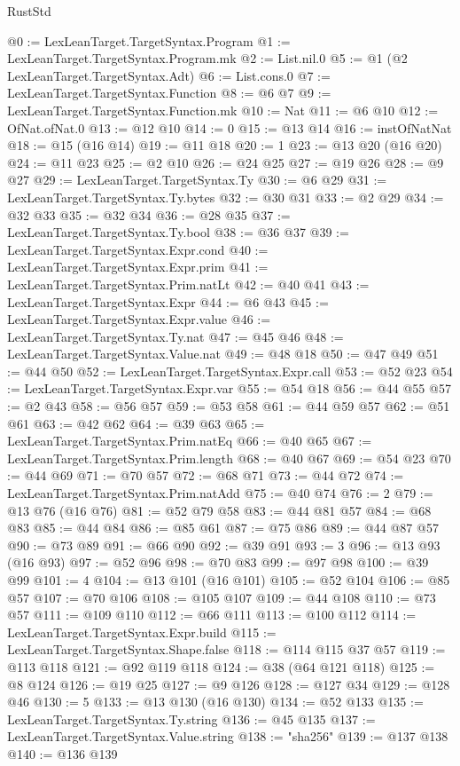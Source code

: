\begin{lexlean}{RustStd}
\begin{coremodule}
{\begin{coremodule}
{{{{{{{{{{{{{{{@0 := LexLeanTarget.TargetSyntax.Program
@1 := LexLeanTarget.TargetSyntax.Program.mk
@2 := List.nil.{0}
@5 := @1 (@2 LexLeanTarget.TargetSyntax.Adt)
@6 := List.cons.{0}
@7 := LexLeanTarget.TargetSyntax.Function
@8 := @6 @7
@9 := LexLeanTarget.TargetSyntax.Function.mk
@10 := Nat
@11 := @6 @10
@12 := OfNat.ofNat.{0}
@13 := @12 @10
@14 := 0
@15 := @13 @14
@16 := instOfNatNat
@18 := @15 (@16 @14)
@19 := @11 @18
@20 := 1
@23 := @13 @20 (@16 @20)
@24 := @11 @23
@25 := @2 @10
@26 := @24 @25
@27 := @19 @26
@28 := @9 @27
@29 := LexLeanTarget.TargetSyntax.Ty
@30 := @6 @29
@31 := LexLeanTarget.TargetSyntax.Ty.bytes
@32 := @30 @31
@33 := @2 @29
@34 := @32 @33
@35 := @32 @34
@36 := @28 @35
@37 := LexLeanTarget.TargetSyntax.Ty.bool
@38 := @36 @37
@39 := LexLeanTarget.TargetSyntax.Expr.cond
@40 := LexLeanTarget.TargetSyntax.Expr.prim
@41 := LexLeanTarget.TargetSyntax.Prim.natLt
@42 := @40 @41
@43 := LexLeanTarget.TargetSyntax.Expr
@44 := @6 @43
@45 := LexLeanTarget.TargetSyntax.Expr.value
@46 := LexLeanTarget.TargetSyntax.Ty.nat
@47 := @45 @46
@48 := LexLeanTarget.TargetSyntax.Value.nat
@49 := @48 @18
@50 := @47 @49
@51 := @44 @50
@52 := LexLeanTarget.TargetSyntax.Expr.call
@53 := @52 @23
@54 := LexLeanTarget.TargetSyntax.Expr.var
@55 := @54 @18
@56 := @44 @55
@57 := @2 @43
@58 := @56 @57
@59 := @53 @58
@61 := @44 @59 @57
@62 := @51 @61
@63 := @42 @62
@64 := @39 @63
@65 := LexLeanTarget.TargetSyntax.Prim.natEq
@66 := @40 @65
@67 := LexLeanTarget.TargetSyntax.Prim.length
@68 := @40 @67
@69 := @54 @23
@70 := @44 @69
@71 := @70 @57
@72 := @68 @71
@73 := @44 @72
@74 := LexLeanTarget.TargetSyntax.Prim.natAdd
@75 := @40 @74
@76 := 2
@79 := @13 @76 (@16 @76)
@81 := @52 @79 @58
@83 := @44 @81 @57
@84 := @68 @83
@85 := @44 @84
@86 := @85 @61
@87 := @75 @86
@89 := @44 @87 @57
@90 := @73 @89
@91 := @66 @90
@92 := @39 @91
@93 := 3
@96 := @13 @93 (@16 @93)
@97 := @52 @96
@98 := @70 @83
@99 := @97 @98
@100 := @39 @99
@101 := 4
@104 := @13 @101 (@16 @101)
@105 := @52 @104
@106 := @85 @57
@107 := @70 @106
@108 := @105 @107
@109 := @44 @108
@110 := @73 @57
@111 := @109 @110
@112 := @66 @111
@113 := @100 @112
@114 := LexLeanTarget.TargetSyntax.Expr.build
@115 := LexLeanTarget.TargetSyntax.Shape.false
@118 := @114 @115 @37 @57
@119 := @113 @118
@121 := @92 @119 @118
@124 := @38 (@64 @121 @118)
@125 := @8 @124
@126 := @19 @25
@127 := @9 @126
@128 := @127 @34
@129 := @128 @46
@130 := 5
@133 := @13 @130 (@16 @130)
@134 := @52 @133
@135 := LexLeanTarget.TargetSyntax.Ty.string
@136 := @45 @135
@137 := LexLeanTarget.TargetSyntax.Value.string
@138 := "sha256"
@139 := @137 @138
@140 := @136 @139
}}}}}}}}}}}}}}}
\end{coremodule}}
\end{coremodule}
\end{lexlean}
